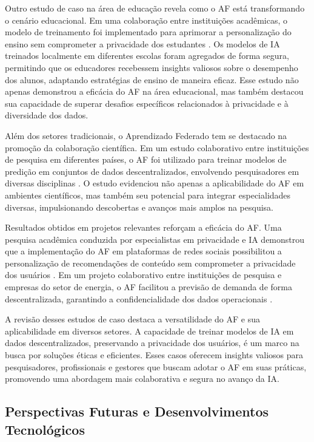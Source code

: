 Outro estudo de caso na área de educação revela como o AF está transformando o cenário educacional. Em uma colaboração entre instituições acadêmicas, o modelo de treinamento foi implementado para aprimorar a personalização do ensino sem comprometer a privacidade dos estudantes \cite{edutechcollab2020}. Os modelos de IA treinados localmente em diferentes escolas foram agregados de forma segura, permitindo que os educadores recebessem insights valiosos sobre o desempenho dos alunos, adaptando estratégias de ensino de maneira eficaz. Esse estudo não apenas demonstrou a eficácia do AF na área educacional, mas também destacou sua capacidade de superar desafios específicos relacionados à privacidade e à diversidade dos dados.

Além dos setores tradicionais, o Aprendizado Federado tem se destacado na promoção da colaboração científica. Em um estudo colaborativo entre instituições de pesquisa em diferentes países, o AF foi utilizado para treinar modelos de predição em conjuntos de dados descentralizados, envolvendo pesquisadores em diversas disciplinas \cite{scicollab2021}. O estudo evidenciou não apenas a aplicabilidade do AF em ambientes científicos, mas também seu potencial para integrar especialidades diversas, impulsionando descobertas e avanços mais amplos na pesquisa.

Resultados obtidos em projetos relevantes reforçam a eficácia do AF. Uma pesquisa acadêmica conduzida por especialistas em privacidade e IA demonstrou que a implementação do AF em plataformas de redes sociais possibilitou a personalização de recomendações de conteúdo sem comprometer a privacidade dos usuários \cite{privacyintech2022}. Em um projeto colaborativo entre instituições de pesquisa e empresas do setor de energia, o AF facilitou a previsão de demanda de forma descentralizada, garantindo a confidencialidade dos dados operacionais \cite{energytechcollab2019}.

A revisão desses estudos de caso destaca a versatilidade do AF e sua aplicabilidade em diversos setores. A capacidade de treinar modelos de IA em dados descentralizados, preservando a privacidade dos usuários, é um marco na busca por soluções éticas e eficientes. Esses casos oferecem insights valiosos para pesquisadores, profissionais e gestores que buscam adotar o AF em suas práticas, promovendo uma abordagem mais colaborativa e segura no avanço da IA.

\subsection{Perspectivas Futuras e Desenvolvimentos Tecnológicos}

